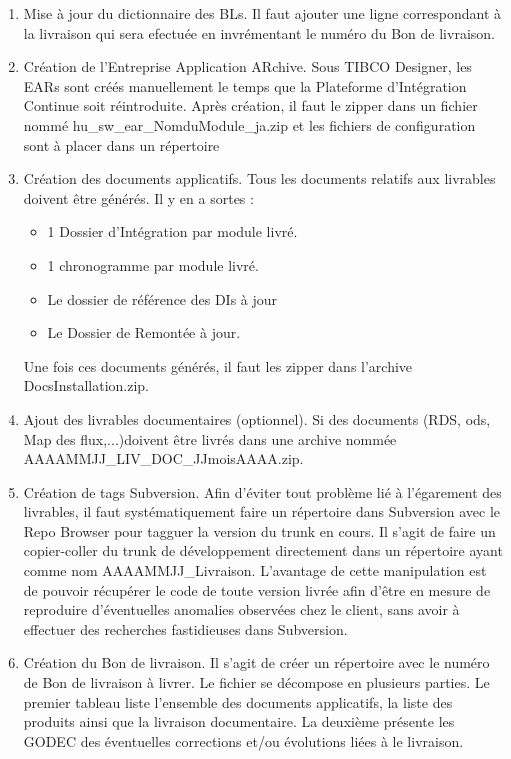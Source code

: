 \begin{enumerate}
	\item Mise à jour du dictionnaire des BLs. Il faut ajouter une ligne correspondant à la livraison qui sera efectuée en invrémentant le numéro du Bon de livraison. 
\item Création de l'Entreprise Application ARchive. Sous TIBCO Designer, les EARs sont créés manuellement le temps que la Plateforme d'Intégration Continue soit réintroduite. Après création, il faut le zipper dans un fichier nommé hu\_sw\_ear\_NomduModule\_ja.zip et les fichiers de configuration sont à placer dans un répertoire 
\item Création des documents applicatifs. Tous les documents relatifs aux livrables doivent être générés. Il y en a sortes : 
\begin{itemize}
	\item 1 Dossier d'Intégration par module livré. 
	\item 1 chronogramme par module livré. 
	\item Le dossier de référence des DIs à jour 
	\item Le Dossier de Remontée à jour. 
\end{itemize}
Une fois ces documents générés, il faut les zipper dans l'archive DocsInstallation.zip. 
\item Ajout des livrables documentaires (optionnel). Si des documents (RDS, ods, Map des flux,...)doivent être livrés dans une archive nommée AAAAMMJJ\_LIV\_DOC\_JJmoisAAAA.zip.
\item Création de tags Subversion. Afin d'éviter tout problème lié à l'égarement des livrables, il faut systématiquement faire un répertoire dans Subversion avec le Repo Browser pour tagguer la version du trunk en cours. Il s'agit de faire un copier-coller du trunk de développement directement dans un répertoire ayant comme nom AAAAMMJJ\_Livraison. L'avantage de cette manipulation est de pouvoir récupérer le code de toute version livrée afin d'être en mesure de reproduire d'éventuelles anomalies observées chez le client, sans avoir à effectuer des recherches fastidieuses dans Subversion.
\item Création du Bon de livraison. Il s'agit de créer un répertoire avec le numéro de Bon de livraison à livrer. Le fichier se décompose en plusieurs parties. Le premier tableau liste l'ensemble des documents applicatifs, la liste des produits ainsi que la livraison documentaire. La deuxième présente les GODEC des éventuelles corrections et/ou évolutions liées à le livraison.

\end{enumerate}
